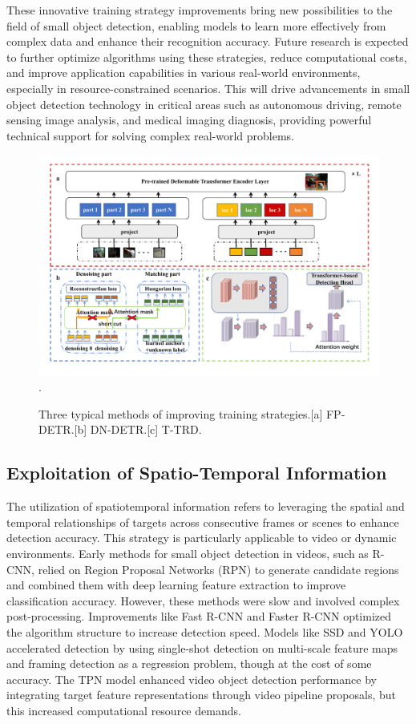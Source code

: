 \documentclass[journal]{IEEEtran}
\begin{document}
These innovative training strategy improvements bring new possibilities to the field of small object detection, enabling models to learn more effectively from complex data and enhance their recognition accuracy. Future research is expected to further optimize algorithms using these strategies, reduce computational costs, and improve application capabilities in various real-world environments, especially in resource-constrained scenarios. This will drive advancements in small object detection technology in critical areas such as autonomous driving, remote sensing image analysis, and medical imaging diagnosis, providing powerful technical support for solving complex real-world problems.

\begin{figure}[htbp]
	\centering
	\setlength{\abovecaptionskip}{-0.6cm}
	\includegraphics[width=\textwidth]{fig 7}
	\DeclareGraphicsExtensions.
	\caption{Three typical methods of improving training strategies.[a] FP-DETR.[b] DN-DETR.[c] T-TRD.}
	\label{fig 1}
\end{figure}


\subsection{Exploitation of Spatio-Temporal Information}

The utilization of spatiotemporal information refers to leveraging the spatial and temporal relationships of targets across consecutive frames or scenes to enhance detection accuracy. This strategy is particularly applicable to video or dynamic environments. Early methods for small object detection in videos, such as R-CNN, relied on Region Proposal Networks (RPN) to generate candidate regions and combined them with deep learning feature extraction to improve classification accuracy. However, these methods were slow and involved complex post-processing. Improvements like Fast R-CNN and Faster R-CNN optimized the algorithm structure to increase detection speed. Models like SSD and YOLO accelerated detection by using single-shot detection on multi-scale feature maps and framing detection as a regression problem, though at the cost of some accuracy. The TPN\cite{zhu2021tph} model enhanced video object detection performance by integrating target feature representations through video pipeline proposals, but this increased computational resource demands.
\end{document}
